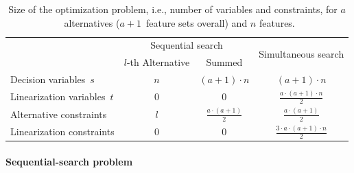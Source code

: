 \documentclass{article}
\theoremstyle{definition}
\begin{document}
\begin{table}[t]
	\centering
	\renewcommand*{\arraystretch}{1.3}
	\begin{tabular}{lccc}
		\toprule
		& \multicolumn{2}{c}{Sequential search} & \multirow{2}{*}{Simultaneous search} \\
		\cmidrule(lr){2-3}
		& $l$-th Alternative & Summed & \\
		\midrule
		Decision variables~$s$ & $n$ & $ (a+1) \cdot n$ & $(a+1) \cdot n$ \\
		Linearization variables~$t$ & $0$ & $0$ & $\frac{a \cdot (a+1) \cdot n}{2}$ \\
		Alternative constraints & $l$ & $\frac{a \cdot (a+1)}{2}$ & $\frac{a \cdot (a+1)}{2}$ \\
		Linearization constraints & $0$ & $0$ & $\frac{3 \cdot a \cdot (a+1) \cdot n}{2}$ \\
		\bottomrule
	\end{tabular}
	\caption{Size of the optimization problem, i.e., number of variables and constraints, for $a$~alternatives ($a + 1$~feature sets overall) and $n$ features.}
	\label{tab:afs:seq-sim-comparison}
\end{table}

\paragraph{Sequential-search problem}
\end{document}
